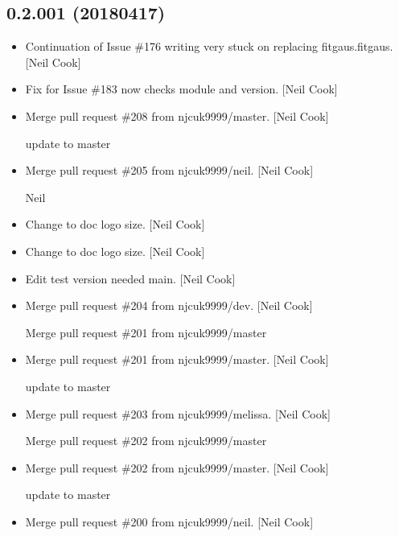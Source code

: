 \documentclass[a4paper,10pt,english]{report}
\begin{document}
\subsection{0.2.001 (2018\sphinxhyphen{}04\sphinxhyphen{}17)}
\label{\detokenize{misc/changelog:id478}}\begin{itemize}
\item {} 
Continuation of Issue \#176 \sphinxhyphen{} writing  \sphinxhyphen{} very stuck on replacing
fitgaus.fitgaus. {[}Neil Cook{]}

\item {} 
Fix for Issue \#183 \sphinxhyphen{} now checks module and version. {[}Neil Cook{]}

\item {} 
Merge pull request \#208 from njcuk9999/master. {[}Neil Cook{]}

update to master

\item {} 
Merge pull request \#205 from njcuk9999/neil. {[}Neil Cook{]}

Neil

\item {} 
Change to doc logo size. {[}Neil Cook{]}

\item {} 
Change to doc logo size. {[}Neil Cook{]}

\item {} 
Edit \sphinxhyphen{} test version needed main. {[}Neil Cook{]}

\item {} 
Merge pull request \#204 from njcuk9999/dev. {[}Neil Cook{]}

Merge pull request \#201 from njcuk9999/master

\item {} 
Merge pull request \#201 from njcuk9999/master. {[}Neil Cook{]}

update to master

\item {} 
Merge pull request \#203 from njcuk9999/melissa. {[}Neil Cook{]}

Merge pull request \#202 from njcuk9999/master

\item {} 
Merge pull request \#202 from njcuk9999/master. {[}Neil Cook{]}

update to master

\item {} 
Merge pull request \#200 from njcuk9999/neil. {[}Neil Cook{]}


\end{itemize}
\end{document}
